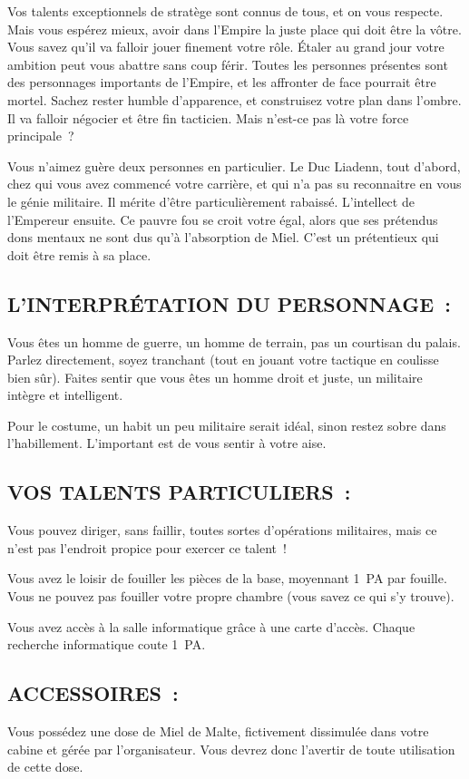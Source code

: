 \documentclass[14pt,twocolumn]{extarticle}
\begin{document}
Vos talents exceptionnels de stratège sont connus de tous, et on vous respecte.
Mais vous espérez mieux, avoir dans l'Empire la juste place qui doit être la
vôtre. Vous savez qu'il va falloir jouer finement votre rôle. Étaler au grand
jour votre ambition peut vous abattre sans coup férir. Toutes les personnes
présentes sont des personnages importants de l'Empire, et les affronter de face
pourrait être mortel. Sachez rester humble d'apparence, et construisez votre
plan dans l'ombre. Il va falloir négocier et être fin tacticien. Mais n'est-ce
pas là votre force principale~?

Vous n'aimez guère deux personnes en particulier. Le Duc Liadenn, tout d'abord,
chez qui vous avez commencé votre carrière, et qui n'a pas su reconnaitre en
vous le génie militaire. Il mérite d'être particulièrement rabaissé.
L'intellect de l'Empereur ensuite. Ce pauvre fou se croit votre égal, alors que
ses prétendus dons mentaux ne sont dus qu'à l'absorption de Miel. C'est un
prétentieux qui doit être remis à sa place.

\subsection{L'INTERPRÉTATION DU PERSONNAGE~:}

Vous êtes un homme de guerre, un homme de terrain, pas un courtisan du palais.
Parlez directement, soyez tranchant (tout en jouant votre tactique en coulisse
bien sûr). Faites sentir que vous êtes un homme droit et juste, un militaire
intègre et intelligent.

Pour le costume, un habit un peu militaire serait idéal, sinon restez sobre
dans l'habillement. L'important est de vous sentir à votre aise.

\subsection{VOS TALENTS PARTICULIERS~:}

Vous pouvez diriger, sans faillir, toutes sortes d'opérations militaires, mais
ce n'est pas l'endroit propice pour exercer ce talent~!

Vous avez le loisir de fouiller les pièces de la base, moyennant 1~PA par
fouille. Vous ne pouvez pas fouiller votre propre chambre (vous savez ce qui
s'y trouve).

Vous avez accès à la salle informatique grâce à une carte d'accès. Chaque
recherche informatique coute 1~PA.

\subsection{ACCESSOIRES~:}

Vous possédez une dose de Miel de Malte, fictivement dissimulée dans votre
cabine et gérée par l'organisateur. Vous devrez donc l'avertir de toute
utilisation de cette dose.
\end{document}
